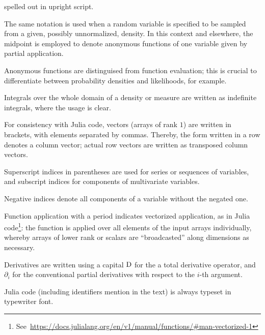 \begin{symbolicfootnotes}
\begin{description}[style=nextline, leftmargin=4cm]
    spelled out in upright script.
  \item[{\(Y \from q(\cdot, X_{i-1})\)}] The same notation is used when a random variable is specified
    to be sampled from a given, possibly unnormalized, density.  In this context and elsewhere, the
    midpoint is employed to denote anonymous functions of one variable given by partial application.
  \item[{\(y \mapsto \prob{x \given y, z}\)}] Anonymous functions are distinguised from function
    evaluation; this is crucial to differentiate between probability densities and likelihoods, for
    example.
  \item[\(\int \prob{x} \dif x = 1\)] Integrals over the whole domain of a density or measure are
    written as indefinite integrals, where the usage is clear.
  \item[{\([x, y, z] = \smash[b]{\left(\begin{smallmatrix}x\\y\\z\end{smallmatrix}\right)}\)}] For
    consistency with Julia code, vectors (arrays of rank \(1\)) are written in brackets, with
    elements separated by commas.  Thereby, the form written in a row denotes a column vector;
    actual row vectors are written as transposed column vectors.
  \item[{\(\kth{\Theta} = [\kth{\Theta}_1, \ldots, \kth{\Theta}_N]\)}] Superscript indices in
    parentheses are used for series or sequences of variables, and subscript indices for components of
    multivariate variables.
  \item[{\(z_{-i} = [z_{1}, \ldots, z_{i-1}, z_{i+1}, \ldots, z_{N}]\)}] Negative indices denote all
    components of a variable without the negated one.
  \item[{\(\broadcast{f}(x, 1) = [f(x_{1}, 1), \ldots, f(x_{N}, 1)]\)}] Function application with a
    period indicates vectorized application, as in Julia
    code\footnote{See~\protect\url{https://docs.julialang.org/en/v1/manual/functions/\#man-vectorized-1}}:
    the function is applied over all elements of the input arrays individually, whereby arrays of
    lower rank or scalars are \enquote{broadcasted} along dimensions as necessary.
  \item[{\(\Dif F(x, y) = (\Delta_1, \Delta_2) \mapsto \partial_1F(x, y)\,\Delta_1 + \partial_2F(x,
      y)\,\Delta_2\)}] Derivatives are written using a capital \(\mathop{}\!\mathrm{D}\) for the a total derivative
    operator, and \(\partial_i\) for the conventional partial derivatives with respect to the
    \(i\)-th argument.
  \item[{\jlinlfont f(x) = rand(x)}] Julia code (including identifiers mention in the text) is
    always typeset in typewriter font.
  \end{description}
\end{symbolicfootnotes}

